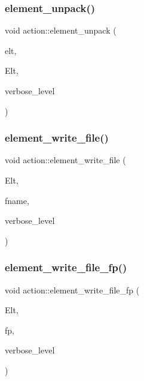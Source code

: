 \mbox{\label{classaction_a02107279a3bdcf054008bd180dfaef10}} 
\subsubsection{\texorpdfstring{element\+\_\+unpack()}{element\_unpack()}}
{\footnotesize\ttfamily void action\+::element\+\_\+unpack (\begin{DoxyParamCaption}\item[{void $\ast$}]{elt,  }\item[{void $\ast$}]{Elt,  }\item[{\mbox{\hyperlink{galois_8h_a09fddde158a3a20bd2dcadb609de11dc}{I\+NT}}}]{verbose\+\_\+level }\end{DoxyParamCaption})}

\mbox{\label{classaction_adce5d9f7c930c890b6b9c5458a0a1d9e}} 
\subsubsection{\texorpdfstring{element\+\_\+write\+\_\+file()}{element\_write\_file()}}
{\footnotesize\ttfamily void action\+::element\+\_\+write\+\_\+file (\begin{DoxyParamCaption}\item[{\mbox{\hyperlink{galois_8h_a09fddde158a3a20bd2dcadb609de11dc}{I\+NT}} $\ast$}]{Elt,  }\item[{const \mbox{\hyperlink{galois_8h_ab6cc7b4aeb6ea31aba2b3fbfc83ff5e6}{B\+Y\+TE}} $\ast$}]{fname,  }\item[{\mbox{\hyperlink{galois_8h_a09fddde158a3a20bd2dcadb609de11dc}{I\+NT}}}]{verbose\+\_\+level }\end{DoxyParamCaption})}

\mbox{\label{classaction_a74da797b9df8fdf82b584e065fe9de63}} 
\subsubsection{\texorpdfstring{element\+\_\+write\+\_\+file\+\_\+fp()}{element\_write\_file\_fp()}}
{\footnotesize\ttfamily void action\+::element\+\_\+write\+\_\+file\+\_\+fp (\begin{DoxyParamCaption}\item[{\mbox{\hyperlink{galois_8h_a09fddde158a3a20bd2dcadb609de11dc}{I\+NT}} $\ast$}]{Elt,  }\item[{F\+I\+LE $\ast$}]{fp,  }\item[{\mbox{\hyperlink{galois_8h_a09fddde158a3a20bd2dcadb609de11dc}{I\+NT}}}]{verbose\+\_\+level }\end{DoxyParamCaption})}

